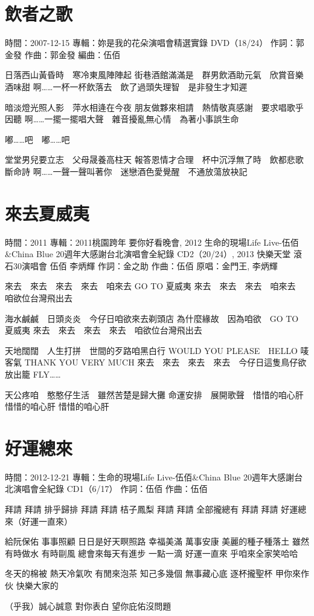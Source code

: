 \documentclass[UTF8,a4paper,oneside,twocolumn,12pt]{ctexbook}
\newcommand{\infopair}[2]{\textbullet #1：#2}
\newcommand{\zc}[1][伍佰]{\infopair{作詞}{#1}}
\newcommand{\zq}[1][伍佰]{\infopair{作曲}{#1}}
\newcommand{\bq}[1][伍佰]{\infopair{編曲}{#1}}
\newcommand{\zj}[1]{\infopair{專輯}{#1}}
\newcommand{\yc}[1]{\infopair{原唱}{#1}}
\newcommand{\sj}[1]{\infopair{時間}{#1}}
\newenvironment{info}{\begin{flushleft}\kaishu
	}
	{\end{flushleft}\normalsize\yahei\par}
\newenvironment{lyric}{
	}
{}
\begin{document}
\section{飲者之歌}
\begin{info}
	\sj{2007-12-15}
	\zj{妳是我的花朵演唱會精選實錄 DVD（18/24）}
	\zc[郭金發]
	\zq[郭金發]
	\bq[伍佰]
\end{info}
\begin{lyric}
	日落西山黃昏時　寒冷東風陣陣起
	街巷酒館滿滿是　群男飲酒助元氣　欣賞音樂酒味甜
	啊……一杯一杯飲落去　飲了過頭失理智　是非發生才知遲

	暗淡燈光照人影　萍水相逄在今夜
	朋友做夥來相請　熱情敬真感謝　要求唱歌乎因聽
	啊……一擺一擺唱大聲　雜音擾亂無心情　為著小事誤生命

	嘟……吧　嘟……吧

	堂堂男兒要立志　父母晟養高柱天
	報答恩情才合理　杯中沉浮無了時　飲都悲歌斷命詩
	啊……一聲一聲叫著你　迷戀酒色愛覺醒　不通放蕩放袂記
\end{lyric}

\section{來去夏威夷} %
\begin{info}
	\sj{2011}
	\zj{2011桃園跨年 要你好看晚會, 2012 生命的現場Life Live-伍佰\&China Blue 20週年大感謝台北演唱會全紀錄 CD2（20/24）, 2013 快樂天堂 滾石30演唱會 伍佰 李炳輝}
	\zc[金之助] %
	\zq
	\yc{金門王, 李炳輝}
\end{info}
\begin{lyric}
	來去　來去　來去　來去　咱來去 GO TO 夏威夷
	來去　來去　來去　咱來去　咱欲位台灣飛出去

	海水鹹鹹　日頭炎炎　今仔日咱欲來去剃頭店
	為什麼緣故　因為咱欲　GO TO 夏威夷
	來去　來去　來去　來去　咱欲位台灣飛出去

	天地闊闊　人生打拼　世間的歹路咱黑白行
	WOULD YOU PLEASE　HELLO 唛客氣
	THANK YOU VERY MUCH
	來去　來去　來去　來去　今仔日這隻鳥仔欲放出籠
	FLY……

	天公疼咱　憨憨仔生活　雖然苦楚是歸大攤
	命運安排　展開歌聲　惜惜的咱心肝　惜惜的咱心肝 惜惜的咱心肝
\end{lyric}

\section{好運總來}
\begin{info}
	\sj{2012-12-21}
	\zj{生命的現場Life Live-伍佰\&China Blue 20週年大感謝台北演唱會全紀錄 CD1（6/17）}
	\zc
	\zq
\end{info}
\begin{lyric}
	拜請 拜請 排乎歸排
	拜請 拜請 桔子鳳梨
	拜請 拜請 全部攏總有
	拜請 拜請 好運總來（好運一直來）

	給阮保佑 事事照顧 日日是好天瞑照路
	幸福美滿 萬事安康 美麗的種子種落土
	雖然有時做水 有時剾風 總會來每天有進步
	一點一滴 好運一直來 乎咱來全家笑哈哈

	冬天的棉被 熱天冷氣吹 有閒來泡茶 知己多幾個
	無事藏心底 逐杯攏聖杯 甲你來作伙 快樂大家的

	（乎我）誠心誠意 對你表白 望你庇佑沒問題
\end{lyric}
\end{document}
